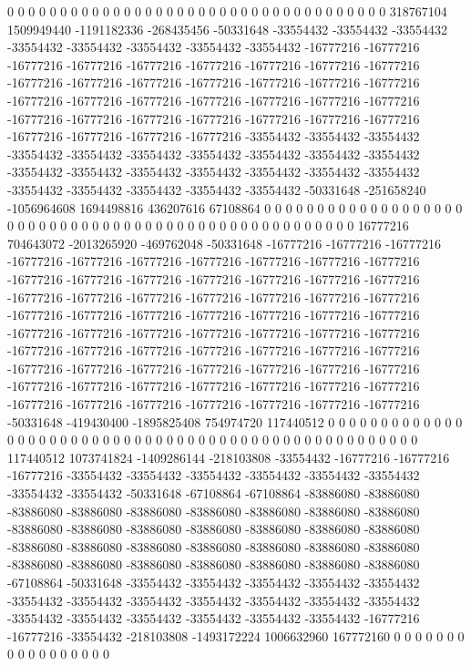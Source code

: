 0 0 0 0 0 0 0 0 0 0 0 0 0 0 0 0 0 0 0 0 0 0 0 0 0 0 0 0 0 0 0 0 0 0 0 0 318767104 1509949440 -1191182336 -268435456 -50331648 -33554432 -33554432 -33554432 -33554432 -33554432 -33554432 -33554432 -33554432 -16777216 -16777216 -16777216 -16777216 -16777216 -16777216 -16777216 -16777216 -16777216 -16777216 -16777216 -16777216 -16777216 -16777216 -16777216 -16777216 -16777216 -16777216 -16777216 -16777216 -16777216 -16777216 -16777216 -16777216 -16777216 -16777216 -16777216 -16777216 -16777216 -16777216 -16777216 -16777216 -16777216 -16777216 -33554432 -33554432 -33554432 -33554432 -33554432 -33554432 -33554432 -33554432 -33554432 -33554432 -33554432 -33554432 -33554432 -33554432 -33554432 -33554432 -33554432 -33554432 -33554432 -33554432 -33554432 -33554432 -50331648 -251658240 -1056964608 1694498816 436207616 67108864 0 0 0 0 0 0 0 0 0 0 0 0 0 0 0 0 0
0 0 0 0 0 0 0 0 0 0 0 0 0 0 0 0 0 0 0 0 0 0 0 0 0 0 0 0 0 0 0 0 0 0 0 16777216 704643072 -2013265920 -469762048 -50331648 -16777216 -16777216 -16777216 -16777216 -16777216 -16777216 -16777216 -16777216 -16777216 -16777216 -16777216 -16777216 -16777216 -16777216 -16777216 -16777216 -16777216 -16777216 -16777216 -16777216 -16777216 -16777216 -16777216 -16777216 -16777216 -16777216 -16777216 -16777216 -16777216 -16777216 -16777216 -16777216 -16777216 -16777216 -16777216 -16777216 -16777216 -16777216 -16777216 -16777216 -16777216 -16777216 -16777216 -16777216 -16777216 -16777216 -16777216 -16777216 -16777216 -16777216 -16777216 -16777216 -16777216 -16777216 -16777216 -16777216 -16777216 -16777216 -16777216 -16777216 -16777216 -16777216 -16777216 -16777216 -16777216 -16777216 -50331648 -419430400 -1895825408 754974720 117440512 0 0 0 0 0 0 0 0 0 0 0 0 0 0 0 0 0
0 0 0 0 0 0 0 0 0 0 0 0 0 0 0 0 0 0 0 0 0 0 0 0 0 0 0 0 0 0 0 0 0 0 0 117440512 1073741824 -1409286144 -218103808 -33554432 -16777216 -16777216 -16777216 -33554432 -33554432 -33554432 -33554432 -33554432 -33554432 -33554432 -33554432 -50331648 -67108864 -67108864 -83886080 -83886080 -83886080 -83886080 -83886080 -83886080 -83886080 -83886080 -83886080 -83886080 -83886080 -83886080 -83886080 -83886080 -83886080 -83886080 -83886080 -83886080 -83886080 -83886080 -83886080 -83886080 -83886080 -83886080 -83886080 -83886080 -83886080 -83886080 -83886080 -83886080 -67108864 -50331648 -33554432 -33554432 -33554432 -33554432 -33554432 -33554432 -33554432 -33554432 -33554432 -33554432 -33554432 -33554432 -33554432 -33554432 -33554432 -33554432 -33554432 -33554432 -16777216 -16777216 -33554432 -218103808 -1493172224 1006632960 167772160 0 0 0 0 0 0 0 0 0 0 0 0 0 0 0 0 0
